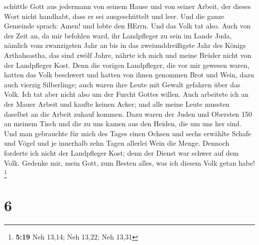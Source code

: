 schüttle Gott aus jedermann von seinem Hause und von seiner Arbeit, der
dieses Wort nicht handhabt, dass er sei ausgeschüttelt und leer. Und die
ganze Gemeinde sprach: Amen! und lobte den HErrn. Und das Volk tat also.
 Auch von der Zeit an, da mir befohlen ward, ihr
Landpfleger zu sein im Lande Juda, nämlich vom zwanzigsten Jahr an bis
in das zweiunddreißigste Jahr des Königs Arthahsastha, das sind zwölf
Jahre, nährte ich mich und meine Brüder nicht von der Landpfleger Kost.
 Denn die vorigen Landpfleger, die vor mir gewesen waren,
hatten das Volk beschwert und hatten von ihnen genommen Brot und Wein,
dazu auch vierzig Silberlinge; auch waren ihre Leute mit Gewalt gefahren
über das Volk. Ich tat aber nicht also um der Furcht Gottes willen.
 Auch arbeitete ich an der Mauer Arbeit und kaufte keinen
Acker; und alle meine Leute mussten daselbst an die Arbeit zuhauf
kommen.  Dazu waren der Juden und Obersten 150 an meinem
Tisch und die zu uns kamen aus den Heiden, die um uns her sind.
 Und man gebrauchte für mich des Tages einen Ochsen und
sechs erwählte Schafe und Vögel und je innerhalb zehn Tagen allerlei
Wein die Menge. Dennoch forderte ich nicht der Landpfleger Kost; denn
der Dienst war schwer auf dem Volk.  Gedenke mir, mein
Gott, zum Besten alles, was ich diesem Volk getan habe! \footnote{\textbf{5:19}
  Neh 13,14; Neh 13,22; Neh 13,31}

\hypertarget{section-1}{%
\section{6}\label{section-1}}


